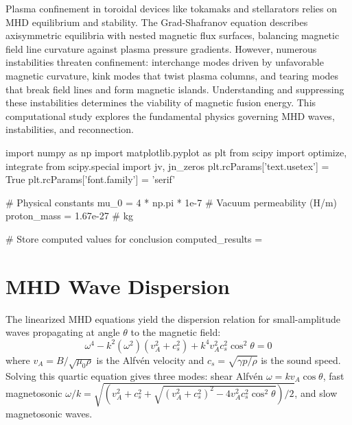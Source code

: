 \documentclass[11pt,a4paper]{article}
\begin{document}
Plasma confinement in toroidal devices like tokamaks and stellarators relies on MHD equilibrium and stability. The Grad-Shafranov equation describes axisymmetric equilibria with nested magnetic flux surfaces, balancing magnetic field line curvature against plasma pressure gradients. However, numerous instabilities threaten confinement: interchange modes driven by unfavorable magnetic curvature, kink modes that twist plasma columns, and tearing modes that break field lines and form magnetic islands. Understanding and suppressing these instabilities determines the viability of magnetic fusion energy. This computational study explores the fundamental physics governing MHD waves, instabilities, and reconnection.

\begin{pycode}

import numpy as np
import matplotlib.pyplot as plt
from scipy import optimize, integrate
from scipy.special import jv, jn_zeros
plt.rcParams['text.usetex'] = True
plt.rcParams['font.family'] = 'serif'

# Physical constants
mu_0 = 4 * np.pi * 1e-7  # Vacuum permeability (H/m)
proton_mass = 1.67e-27  # kg

# Store computed values for conclusion
computed_results = {}

\end{pycode}

\section{MHD Wave Dispersion}

The linearized MHD equations yield the dispersion relation for small-amplitude waves propagating at angle $\theta$ to the magnetic field:
\begin{equation}
\omega^4 - k^2(\omega^2)(v_A^2 + c_s^2) + k^4 v_A^2 c_s^2 \cos^2\theta = 0
\end{equation}
where $v_A = B/\sqrt{\mu_0 \rho}$ is the Alfvén velocity and $c_s = \sqrt{\gamma p / \rho}$ is the sound speed. Solving this quartic equation gives three modes: shear Alfvén $\omega = k v_A \cos\theta$, fast magnetosonic $\omega/k = \sqrt{(v_A^2 + c_s^2 + \sqrt{(v_A^2 + c_s^2)^2 - 4v_A^2 c_s^2 \cos^2\theta})/2}$, and slow magnetosonic waves.
\end{document}
